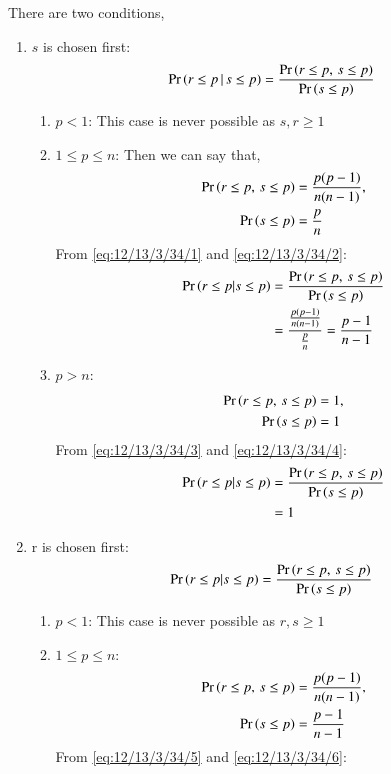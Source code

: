 There are two conditions, 
\begin{enumerate}
\item  $s$ is chosen first:
\begin{align}
\Pr\left(r\le p\,|\,s\le p\right) = \frac{\Pr\left(r \le p, \, s \le p\right)}{\Pr\left(s \le p\right)}
\end{align}
\begin{enumerate}
\item $p<1$:
This case is never possible as $s,r \ge 1$
\item $1 \le p \le n$:
Then we can say that,
\begin{align}
\pr{r \le p, \, s \le p} &= \frac{p(p-1)}{n(n-1)} \label{eq:12/13/3/34/1},\\
\pr{s \le p} &= \frac{p}{n} \label{eq:12/13/3/34/2}
\end{align}
From \eqref{eq:12/13/3/34/1} and \eqref{eq:12/13/3/34/2}:
\begin{align}
\Pr\left(r\le p|s\le p\right) &= \frac{\Pr\left(r \le p, \, s \le p\right)}{\Pr\left(s \le p\right)}\\
&= \frac{\frac{p(p-1)}{n(n-1)}}{\frac{p}{n}}
=\frac{p-1}{n-1}
\end{align}
\item $p>n$:
\begin{align}
\pr{r \le p, \, s \le p} &= 1 \label{eq:12/13/3/34/3},\\
\pr{s \le p} &= 1 \label{eq:12/13/3/34/4}
\end{align}
From \eqref{eq:12/13/3/34/3} and \eqref{eq:12/13/3/34/4}:
\begin{align}
\Pr\left(r\le p|s\le p\right) &= \frac{\Pr\left(r \le p, \, s \le p\right)}{\Pr\left(s \le p\right)}\\
&= 1 
\end{align}
\end{enumerate}
\item  r is chosen first:
\begin{align}
\Pr\left(r\le p|s\le p\right) = \frac{\Pr\left(r \le p, \, s \le p\right)}{\Pr\left(s \le p\right)}
\end{align}
\begin{enumerate}
\item $p<1$:
This case is never possible as $r,s \ge 1$
\item $1 \le p \le n$:
\begin{align}
\pr{r \le p, \, s \le p} &= \frac{p(p-1)}{n(n-1)} \label{eq:12/13/3/34/5},\\
\pr{s \le p} &= \frac{p-1}{n-1} \label{eq:12/13/3/34/6}
\end{align}
From \eqref{eq:12/13/3/34/5} and \eqref{eq:12/13/3/34/6}:

\end{enumerate}
\end{enumerate}
